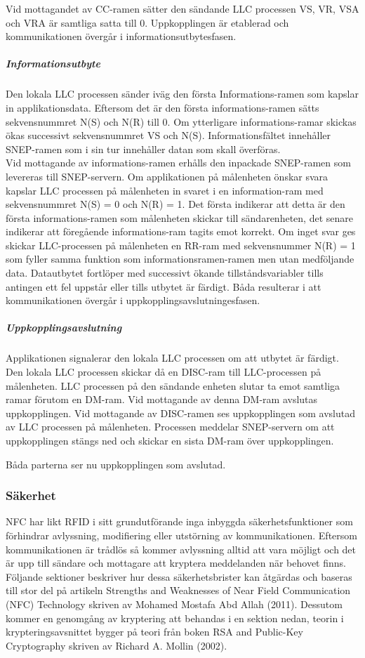 \documentclass[11pt]{article}
\begin{document}
Vid mottagandet av CC-ramen sätter den sändande LLC processen VS, VR, VSA och VRA är samtliga satta till 0. Uppkopplingen är etablerad och kommunikationen övergår i informationsutbytesfasen.

\subparagraph{Informationsutbyte}
Den lokala LLC processen sänder  iväg den första Informations-ramen som kapslar in applikationsdata. Eftersom det är den första informations-ramen sätts sekvensnummret N(S) och N(R) till 0. Om ytterligare informations-ramar skickas ökas successivt sekvensnummret VS och N(S). Informationsfältet innehåller SNEP-ramen som i sin tur innehåller datan som skall överföras.\\
Vid mottagande av informations-ramen erhålls den inpackade SNEP-ramen som levereras till SNEP-servern. Om applikationen på målenheten önskar svara kapslar LLC processen på målenheten in svaret i en information-ram med sekvensnummret N(S) = 0 och N(R) = 1. Det första indikerar att detta är den första informations-ramen som målenheten skickar till sändarenheten, det senare indikerar att föregående informations-ram tagits emot korrekt. Om inget svar ges skickar LLC-processen på målenheten en RR-ram med sekvensnummer N(R) = 1 som fyller samma funktion som informationsramen-ramen men utan medföljande data. Datautbytet fortlöper med successivt ökande tillståndsvariabler tills antingen ett fel uppstår eller tills utbytet är färdigt. Båda resulterar i att kommunikationen övergår i uppkopplingsavslutningesfasen.

\subparagraph{Uppkopplingsavslutning}
Applikationen signalerar den lokala LLC processen om att utbytet är färdigt. Den lokala LLC processen skickar då en DISC-ram till LLC-processen på målenheten. LLC processen på den sändande enheten slutar ta emot samtliga ramar förutom en DM-ram. Vid mottagande av denna DM-ram avslutas uppkopplingen. 
Vid mottagande av DISC-ramen ses uppkopplingen som avslutad av LLC processen på målenheten. Processen meddelar SNEP-servern om att uppkopplingen stängs ned och skickar en sista DM-ram över uppkopplingen.

Båda parterna ser nu uppkopplingen som avslutad.

\subsubsection{Säkerhet}
NFC har likt RFID i sitt grundutförande inga inbyggda säkerhetsfunktioner som förhindrar avlyssning, modifiering eller utstörning av kommunikationen. Eftersom kommunikationen är trådlös så kommer avlyssning alltid att vara möjligt och det är upp till sändare och mottagare att kryptera meddelanden när behovet finns. Följande sektioner beskriver hur dessa säkerhetsbrister kan åtgärdas och baseras till stor del på artikeln Strengths and Weaknesses of Near Field Communication (NFC) Technology skriven av Mohamed Mostafa Abd Allah (2011). Dessutom kommer en genomgång av kryptering att behandas i en sektion nedan, teorin i krypteringsavsnittet bygger på teori från boken RSA and Public-Key Cryptography skriven av Richard A. Mollin (2002).
\end{document}
